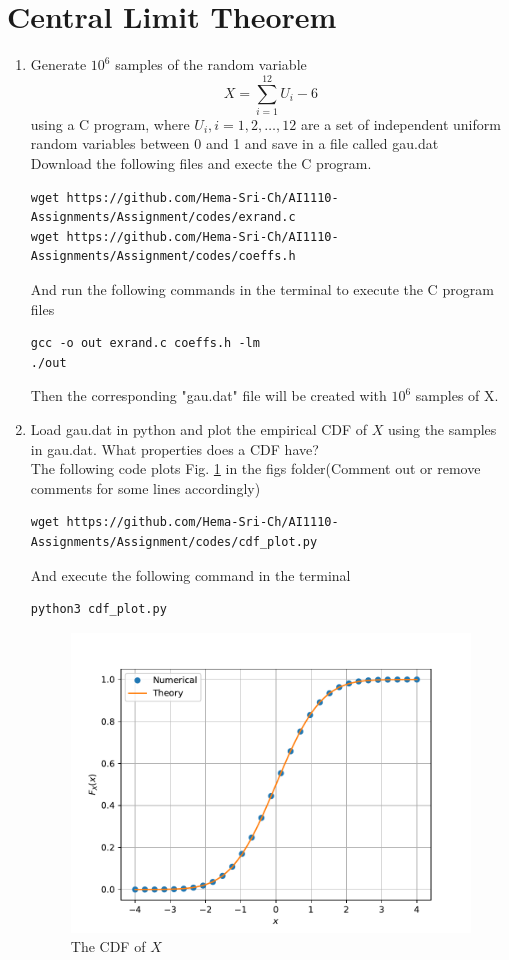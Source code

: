 \documentclass[journal,12pt,twocolumn]{article}
\renewcommand\thesection{\arabic{section}}
\begin{document}
\section{Central Limit Theorem}
%
\begin{enumerate}[label=\thesection.\arabic*
,ref=\thesection.\theenumi]
%
\item
Generate $10^6$ samples of the random variable
%
\begin{equation}
X = \sum_{i=1}^{12}U_i -6
\end{equation}
%
using a C program, where $U_i, i = 1,2,\dots, 12$ are  a set of independent uniform random variables between 0 and 1
and save in a file called gau.dat
%
\\
\solution Download the following files and execte the C program.
\begin{lstlisting}
wget https://github.com/Hema-Sri-Ch/AI1110-Assignments/Assignment/codes/exrand.c
wget https://github.com/Hema-Sri-Ch/AI1110-Assignments/Assignment/codes/coeffs.h
\end{lstlisting}
And run the following commands in the terminal to execute the C program files
\begin{lstlisting}
gcc -o out exrand.c coeffs.h -lm
./out
\end{lstlisting}
Then the corresponding "gau.dat" file will be created with $10^6$ samples of X.

\item
Load gau.dat in python and plot the empirical CDF of $X$ using the samples in gau.dat. What properties does a CDF have?
\\
\solution The following code plots Fig. \ref{fig:gauss_cdf} in the figs folder(Comment out or remove comments for some lines accordingly)
\begin{lstlisting}
wget https://github.com/Hema-Sri-Ch/AI1110-Assignments/Assignment/codes/cdf_plot.py
\end{lstlisting}
And execute the following command in the terminal 
\begin{lstlisting}
python3 cdf_plot.py
\end{lstlisting}
\begin{figure}[h]
	\centering
	\includegraphics[width=\columnwidth]{gauss_cdf}
	\caption{The CDF of $X$}
	\label{fig:gauss_cdf}
\end{figure}


\end{enumerate}
\end{document}

